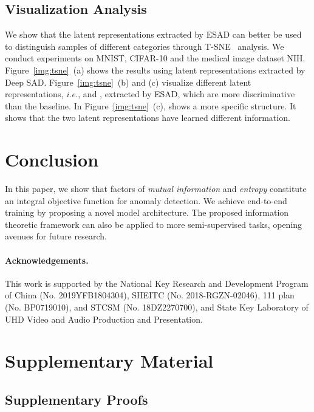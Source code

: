 \documentclass{bmvc2k}
\begin{document}
\vspace{-10pt}
\subsection{Visualization Analysis}\label{sec:vis}
We show that the latent representations extracted by ESAD can better be used to distinguish samples of different categories through T-SNE~\cite{maaten2008visualizing} analysis. We conduct experiments on MNIST, CIFAR-10 and the medical image dataset NIH. Figure~\ref{img:tsne}~(a) shows the results using latent representations extracted by Deep SAD. Figure~\ref{img:tsne}~(b) and (c) visualize different latent representations, \emph{i.e.},  and , extracted by ESAD, which are more discriminative than the baseline. In Figure~\ref{img:tsne}~(c),  shows a more specific structure. It shows that the two latent representations have learned different information.

\vspace{-10pt}
\section{Conclusion}
\vspace{-3pt}
In this paper, we show that factors of \emph{mutual information} and \emph{entropy} constitute an integral objective function for anomaly detection. We achieve end-to-end training by proposing a novel model architecture. The proposed information theoretic framework can also be applied to more semi-supervised tasks, opening avenues for future research.

\paragraph{Acknowledgements.} 
This work is supported by the National Key Research and Development Program of China (No. 2019YFB1804304), SHEITC (No. 2018-RGZN-02046), 111 plan (No. BP0719010),  and STCSM (No. 18DZ2270700), and State Key Laboratory of UHD Video and Audio Production and Presentation.

\small


\section{Supplementary Material}
\subsection{Supplementary Proofs} 
\end{document}
